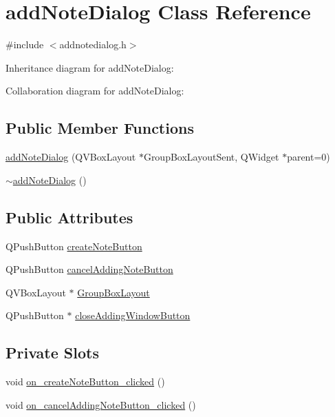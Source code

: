 \hypertarget{classaddNoteDialog}{}\section{add\+Note\+Dialog Class Reference}
\label{classaddNoteDialog}


{\ttfamily \#include $<$addnotedialog.\+h$>$}



Inheritance diagram for add\+Note\+Dialog\+:


Collaboration diagram for add\+Note\+Dialog\+:
\subsection*{Public Member Functions}
\begin{DoxyCompactItemize}
\item 
\hyperlink{classaddNoteDialog_afc2d1dcbc9b0e6139859c61606c7f9f1}{add\+Note\+Dialog} (Q\+V\+Box\+Layout $\ast$Group\+Box\+Layout\+Sent, Q\+Widget $\ast$parent=0)
\item 
\hyperlink{classaddNoteDialog_a900c8ab72a54252fa03299d821af644f}{$\sim$add\+Note\+Dialog} ()
\end{DoxyCompactItemize}
\subsection*{Public Attributes}
\begin{DoxyCompactItemize}
\item 
Q\+Push\+Button \hyperlink{classaddNoteDialog_ae424f90e2d41fa5ec323d4c93a91f527}{create\+Note\+Button}
\item 
Q\+Push\+Button \hyperlink{classaddNoteDialog_a05ecc54eb7cba0d6ffbc5cabc8a4f551}{cancel\+Adding\+Note\+Button}
\item 
Q\+V\+Box\+Layout $\ast$ \hyperlink{classaddNoteDialog_aec3ffbbf5c9ceebc839678cb1c842499}{Group\+Box\+Layout}
\item 
Q\+Push\+Button $\ast$ \hyperlink{classaddNoteDialog_af1d9adf48985dc8ca2ec30c60c3d569e}{close\+Adding\+Window\+Button}
\end{DoxyCompactItemize}
\subsection*{Private Slots}
\begin{DoxyCompactItemize}
\item 
void \hyperlink{classaddNoteDialog_a67b28dc05851888a45774eb240d6e43d}{on\+\_\+create\+Note\+Button\+\_\+clicked} ()
\item 
void \hyperlink{classaddNoteDialog_af0e53e8f605b12087a3982e53409ca2f}{on\+\_\+cancel\+Adding\+Note\+Button\+\_\+clicked} ()
\end{DoxyCompactItemize}
